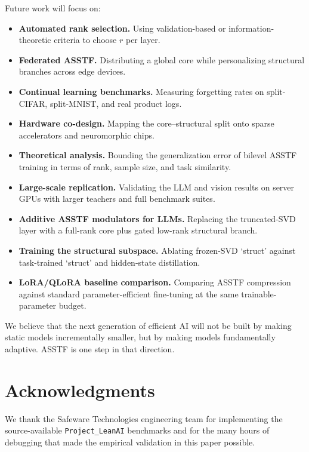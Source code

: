 \documentclass[11pt,a4paper]{article}
\theoremstyle{definition}
\begin{document}
Future work will focus on:
\begin{itemize}
    \item \textbf{Automated rank selection.} Using validation-based or information-theoretic criteria to choose $r$ per layer.
    \item \textbf{Federated ASSTF.} Distributing a global core while personalizing structural branches across edge devices.
    \item \textbf{Continual learning benchmarks.} Measuring forgetting rates on split-CIFAR, split-MNIST, and real product logs.
    \item \textbf{Hardware co-design.} Mapping the core--structural split onto sparse accelerators and neuromorphic chips.
    \item \textbf{Theoretical analysis.} Bounding the generalization error of bilevel ASSTF training in terms of rank, sample size, and task similarity.
    \item \textbf{Large-scale replication.} Validating the LLM and vision results on server GPUs with larger teachers and full benchmark suites.
    \item \textbf{Additive ASSTF modulators for LLMs.} Replacing the truncated-SVD layer with a full-rank core plus gated low-rank structural branch.
    \item \textbf{Training the structural subspace.} Ablating frozen-SVD `struct' against task-trained `struct' and hidden-state distillation.
    \item \textbf{LoRA/QLoRA baseline comparison.} Comparing ASSTF compression against standard parameter-efficient fine-tuning at the same trainable-parameter budget.
\end{itemize}

We believe that the next generation of efficient AI will not be built by making static models incrementally smaller, but by making models fundamentally adaptive. ASSTF is one step in that direction.

\section*{Acknowledgments}

We thank the Safeware Technologies engineering team for implementing the source-available \texttt{Project\_LeanAI} benchmarks and for the many hours of debugging that made the empirical validation in this paper possible.
\end{document}
